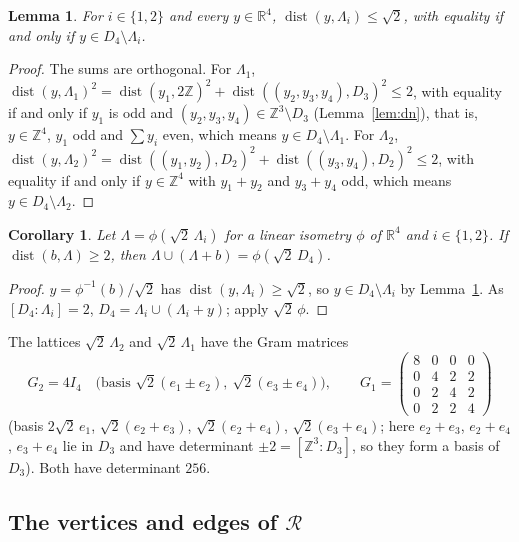 \documentclass[11pt,reqno]{amsart}
\renewcommand{\_}{\origunderscore\allowbreak}
\numberwithin{equation}{section}
\theoremstyle{plain}
\newtheorem{lem}[thm]{Lemma}
\newtheorem{cor}[thm]{Corollary}
\theoremstyle{definition}
\theoremstyle{remark}
\newcommand{\R}{\mathbb{R}}
\newcommand{\Z}{\mathbb{Z}}
\newcommand{\Rk}{\mathcal{R}}
\newcommand{\dist}{\operatorname{dist}}
\begin{document}
\begin{lem}\label{lem:d4}
For $i\in\{1,2\}$ and every $y\in\R^4$, $\dist(y,\Lambda_i)\le\sqrt2$, with equality if and only if $y\in D_4\setminus\Lambda_i$.
\end{lem}

\begin{proof}
The sums are orthogonal. For $\Lambda_1$, $\dist(y,\Lambda_1)^2=\dist(y_1,2\Z)^2+\dist((y_2,y_3,y_4),D_3)^2\le2$, with equality if and only if $y_1$ is odd and $(y_2,y_3,y_4)\in\Z^3\setminus D_3$ (Lemma~\ref{lem:dn}), that is, $y\in\Z^4$, $y_1$ odd and $\sum y_i$ even, which means $y\in D_4\setminus\Lambda_1$. For $\Lambda_2$, $\dist(y,\Lambda_2)^2=\dist((y_1,y_2),D_2)^2+\dist((y_3,y_4),D_2)^2\le2$, with equality if and only if $y\in\Z^4$ with $y_1+y_2$ and $y_3+y_4$ odd, which means $y\in D_4\setminus\Lambda_2$.
\end{proof}

\begin{cor}\label{cor:d4}
Let $\Lambda=\phi(\sqrt2\,\Lambda_i)$ for a linear isometry $\phi$ of $\R^4$ and $i\in\{1,2\}$. If $\dist(b,\Lambda)\ge2$, then $\Lambda\cup(\Lambda+b)=\phi(\sqrt2\,D_4)$.
\end{cor}

\begin{proof}
$y=\phi^{-1}(b)/\sqrt2$ has $\dist(y,\Lambda_i)\ge\sqrt2$, so $y\in D_4\setminus\Lambda_i$ by Lemma~\ref{lem:d4}. As $[D_4:\Lambda_i]=2$, $D_4=\Lambda_i\cup(\Lambda_i+y)$; apply $\sqrt2\,\phi$.
\end{proof}

The lattices $\sqrt2\,\Lambda_2$ and $\sqrt2\,\Lambda_1$ have the Gram matrices
\begin{equation}\label{eq:grams}
G_2=4I_4\quad\text{(basis }\sqrt2(e_1\pm e_2),\ \sqrt2(e_3\pm e_4)\text{)},\qquad
G_1=\begin{pmatrix}8&0&0&0\\0&4&2&2\\0&2&4&2\\0&2&2&4\end{pmatrix}
\end{equation}
(basis $2\sqrt2\,e_1$, $\sqrt2(e_2+e_3)$, $\sqrt2(e_2+e_4)$, $\sqrt2(e_3+e_4)$; here $e_2+e_3$, $e_2+e_4$, $e_3+e_4$ lie in $D_3$ and have determinant $\pm2=[\Z^3:D_3]$, so they form a basis of $D_3$). Both have determinant $256$.

\subsection{The vertices and edges of \texorpdfstring{$\Rk$}{R}}\label{sec:computation}
\end{document}

